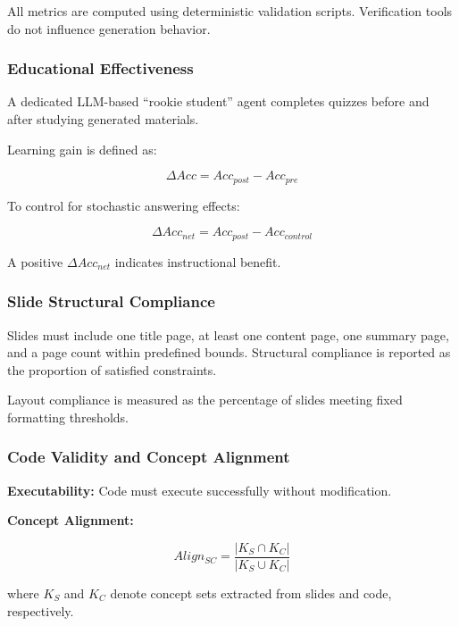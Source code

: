\documentclass[10pt,journal,compsoc]{IEEEtran}
\begin{document}
All metrics are computed using deterministic validation scripts. Verification tools do not influence generation behavior.

\subsubsection{Educational Effectiveness}

A dedicated LLM-based ``rookie student'' agent completes quizzes before and after studying generated materials.

Learning gain is defined as:

\begin{equation}
\Delta Acc = Acc_{post} - Acc_{pre}
\end{equation}

To control for stochastic answering effects:

\begin{equation}
\Delta Acc_{net} = Acc_{post} - Acc_{control}
\end{equation}

A positive $\Delta Acc_{net}$ indicates instructional benefit.

\subsubsection{Slide Structural Compliance}

Slides must include one title page, at least one content page, one summary page, and a page count within predefined bounds. Structural compliance is reported as the proportion of satisfied constraints.

Layout compliance is measured as the percentage of slides meeting fixed formatting thresholds.

\subsubsection{Code Validity and Concept Alignment}

\textbf{Executability:} Code must execute successfully without modification.

\textbf{Concept Alignment:}

\begin{equation}
Align_{SC} = \frac{|K_S \cap K_C|}{|K_S \cup K_C|}
\end{equation}

where $K_S$ and $K_C$ denote concept sets extracted from slides and code, respectively.
\end{document}
